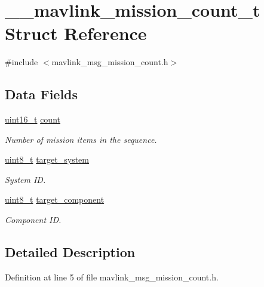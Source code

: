 \hypertarget{struct____mavlink__mission__count__t}{\section{\-\_\-\-\_\-mavlink\-\_\-mission\-\_\-count\-\_\-t Struct Reference}
\label{struct____mavlink__mission__count__t}
}


{\ttfamily \#include $<$mavlink\-\_\-msg\-\_\-mission\-\_\-count.\-h$>$}

\subsection*{Data Fields}
\begin{DoxyCompactItemize}
\item 
\hyperlink{stdint_8h_a273cf69d639a59973b6019625df33e30}{uint16\-\_\-t} \hyperlink{struct____mavlink__mission__count__t_ae0f07b1c9ffca95b6c76cde724eda5d9}{count}
\begin{DoxyCompactList}\small\item\em Number of mission items in the sequence. \end{DoxyCompactList}\item 
\hyperlink{stdint_8h_aba7bc1797add20fe3efdf37ced1182c5}{uint8\-\_\-t} \hyperlink{struct____mavlink__mission__count__t_a9e211af96b9dd62f71c32fb3412dbfca}{target\-\_\-system}
\begin{DoxyCompactList}\small\item\em System I\-D. \end{DoxyCompactList}\item 
\hyperlink{stdint_8h_aba7bc1797add20fe3efdf37ced1182c5}{uint8\-\_\-t} \hyperlink{struct____mavlink__mission__count__t_a21576207ae6595d5272a405fb8c198bf}{target\-\_\-component}
\begin{DoxyCompactList}\small\item\em Component I\-D. \end{DoxyCompactList}\end{DoxyCompactItemize}


\subsection{Detailed Description}


Definition at line 5 of file mavlink\-\_\-msg\-\_\-mission\-\_\-count.\-h.



